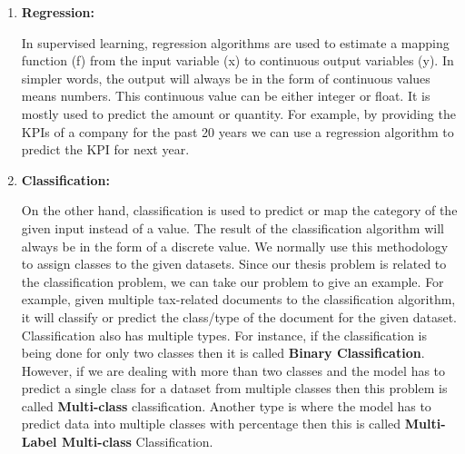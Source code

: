 \begin{enumerate}[label=(\alph*)]
    \item \textbf{Regression:}
    \par
    In supervised learning, regression algorithms are used to estimate a mapping function (f) from the input variable (x) to continuous output variables (y). In simpler words, the output will always be in the form of continuous values means numbers. This continuous value can be either integer or float. It is mostly used to predict the amount or quantity. For example, by providing the KPIs of a company for the past 20 years we can use a regression algorithm to predict the KPI for next year.
    \item \textbf{Classification:}
    \par
    On the other hand, classification is used to predict or map the category of the given input instead of a value. The result of the classification algorithm will always be in the form of a discrete value. We normally use this methodology to assign classes to the given datasets. Since our thesis problem is related to the classification problem, we can take our problem to give an example. For example, given multiple tax-related documents to the classification algorithm, it will classify or predict the class/type of the document for the given dataset. Classification also has multiple types. For instance, if the classification is being done for only two classes then it is called \textbf{Binary Classification}. However, if we are dealing with more than two classes and the model has to predict a single class for a dataset from multiple classes then this problem is called \textbf{Multi-class} classification. Another type is where the model has to predict data into multiple classes with percentage then this is called \textbf{Multi-Label Multi-class} Classification.
\end{enumerate}
